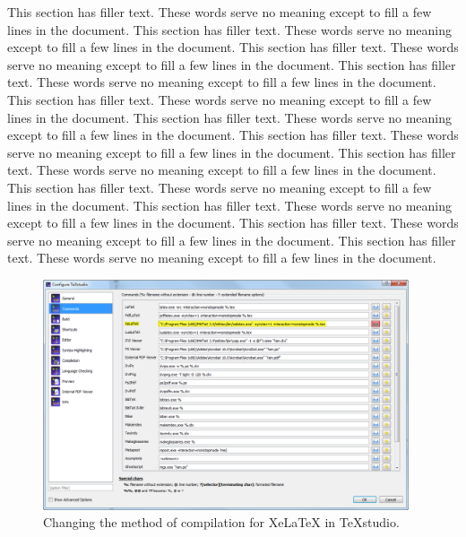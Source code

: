 This section has filler text. These words serve no meaning except to fill a few lines in the document. This section has filler text. These words serve no meaning except to fill a few lines in the document. This section has filler text. These words serve no meaning except to fill a few lines in the document. This section has filler text. These words serve no meaning except to fill a few lines in the document. This section has filler text. These words serve no meaning except to fill a few lines in the document. This section has filler text. These words serve no meaning except to fill a few lines in the document. This section has filler text. These words serve no meaning except to fill a few lines in the document. This section has filler text. These words serve no meaning except to fill a few lines in the document. This section has filler text. These words serve no meaning except to fill a few lines in the document. This section has filler text. These words serve no meaning except to fill a few lines in the document. This section has filler text. These words serve no meaning except to fill a few lines in the document. This section has filler text. These words serve no meaning except to fill a few lines in the document.

\begin{figure}[!h]
	\centering
	\includegraphics[width=4.25in]{images/CompileChange.png}
	\caption{Changing the method of compilation for XeLaTeX in TeXstudio.}
\end{figure}

